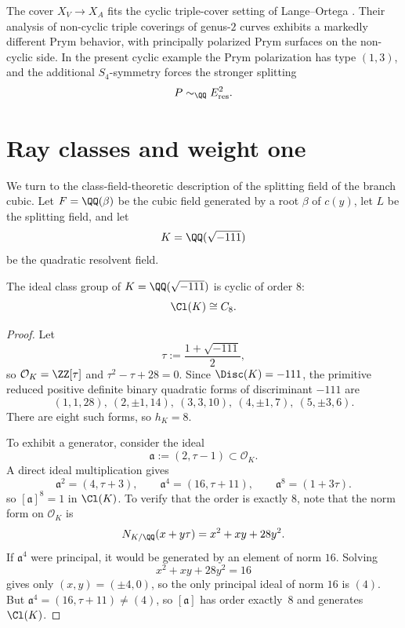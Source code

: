\begin{remark}\label{rem:prym-triple-cover-context}
The cover \(X_V\to X_A\) fits the cyclic triple-cover setting of Lange--Ortega \cite{LangeOrtega2011}. Their analysis of non-cyclic triple coverings of genus-\(2\) curves \cite{LangeOrtegaTriple2011} exhibits a markedly different Prym behavior, with principally polarized Prym surfaces on the non-cyclic side. In the present cyclic example the Prym polarization has type \((1,3)\), and the additional \(S_4\)-symmetry forces the stronger splitting
\[
P\sim_{\QQ}E_{\mathrm{res}}^2.
\]
\end{remark}

\section{Ray classes and weight one}

We turn to the class-field-theoretic description of the splitting field of the branch cubic. Let \(F=\QQ(\beta)\) be the cubic field generated by a root \(\beta\) of \(c(y)\), let \(L\) be the splitting field, and let
\[
K=\QQ(\sqrt{-111})
\]
be the quadratic resolvent field.

\begin{proposition}\label{prop:class-group}
The ideal class group of \(K=\QQ(\sqrt{-111})\) is cyclic of order \(8\):
\[
\Cl(K)\cong C_8.
\]
\end{proposition}

\begin{proof}
Let
\[
\tau:=\frac{1+\sqrt{-111}}{2},
\]
so \(\mathcal O_K=\ZZ[\tau]\) and \(\tau^2-\tau+28=0\). Since \(\Disc(K)=-111\), the primitive reduced positive definite binary quadratic forms of discriminant \(-111\) are
\[
(1,1,28),\ (2,\pm 1,14),\ (3,3,10),\ (4,\pm 1,7),\ (5,\pm 3,6).
\]
There are eight such forms, so \(h_K=8\).

To exhibit a generator, consider the ideal
\[
\mathfrak a:=(2,\tau-1)\subset \mathcal O_K.
\]
A direct ideal multiplication gives
\[
\mathfrak a^2=(4,\tau+3),\qquad
\mathfrak a^4=(16,\tau+11),\qquad
\mathfrak a^8=(1+3\tau).
\]
so \([\mathfrak a]^8=1\) in \(\Cl(K)\). To verify that the order is exactly \(8\), note that the norm form on \(\mathcal O_K\) is
\[
N_{K/\QQ}(x+y\tau)=x^2+xy+28y^2.
\]
If \(\mathfrak a^4\) were principal, it would be generated by an element of norm \(16\). Solving
\[
x^2+xy+28y^2=16
\]
gives only \((x,y)=(\pm 4,0)\), so the only principal ideal of norm \(16\) is \((4)\). But \(\mathfrak a^4=(16,\tau+11)\neq (4)\), so \([\mathfrak a]\) has order exactly~\(8\) and generates \(\Cl(K)\).
\end{proof}

